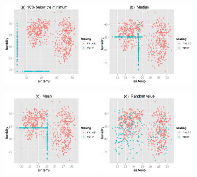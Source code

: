 \documentclass[article]{jss}
\begin{document}
\begin{center}
\begin{figure}[h]
\begin{centering}
\includegraphics[width=0.45\textwidth]{fig3-1} 
\includegraphics[width=0.45\textwidth]{fig3-2}
\par\end{centering}

\begin{centering}
\includegraphics[width=0.45\textwidth]{fig3-3} 
\includegraphics[width=0.45\textwidth]{fig3-4}
\par\end{centering}


\end{figure}
\end{center}
\end{document}
